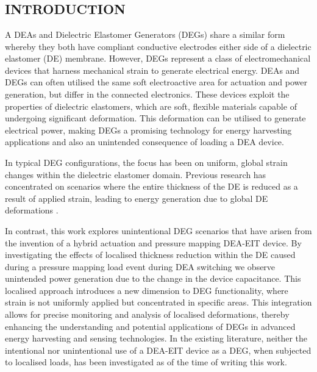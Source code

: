 \chapter{\chapviiname}
\label{chapter7}



\begin{abstract}
	\lipsum
\end{abstract}



\section{INTRODUCTION} %
\label{sec:introduction}
A DEAs and Dielectric Elastomer Generators (DEGs) share a similar form whereby they both have compliant conductive electrodes either side of a dielectric elastomer (DE) membrane. However, DEGs represent a class of electromechanical devices that harness mechanical strain to generate electrical energy. DEAs and DEGs can often utilised the same soft electroactive area for actuation and power generation, but differ in the connected electronics. These devices exploit the properties of dielectric elastomers, which are soft, flexible materials capable of undergoing significant deformation. This deformation can be utilised to generate electrical power, making DEGs a promising technology for energy harvesting applications and also an unintended consequence of loading a DEA device.

In typical DEG configurations, the focus has been on uniform, global strain changes within the dielectric elastomer domain. Previous research has concentrated on scenarios where the entire thickness of the DE is reduced as a result of applied strain, leading to energy generation due to global DE deformations \cite{Carpi2015, Savage2012, Koh2009}.

In contrast, this work explores unintentional DEG scenarios that have arisen from the invention of a hybrid actuation and pressure mapping DEA-EIT device. By investigating the effects of localised thickness reduction within the DE caused during a pressure mapping load event during DEA switching we observe unintended power generation due to the change in the device capacitance. This localised approach introduces a new dimension to DEG functionality, where strain is not uniformly applied but concentrated in specific areas. This integration allows for precise monitoring and analysis of localised deformations, thereby enhancing the understanding and potential applications of DEGs in advanced energy harvesting and sensing technologies. In the existing literature, neither the intentional nor unintentional use of a DEA-EIT device as a DEG, when subjected to localised loads, has been investigated as of the time of writing this work.



